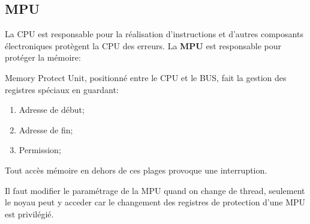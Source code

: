 \documentclass{article}
\begin{document}
\subsection{MPU}
La CPU est responsable pour la réalisation d'instructions et d'autres composants électroniques protègent la CPU des erreurs. La \textbf{MPU} est responsable pour protéger la mémoire:
\begin{definition}\label{def:MPU}
    Memory Protect Unit, positionné entre le CPU et le BUS, fait la gestion des registres spéciaux en guardant:
    \begin{enumerate}[noitemsep]
        \item Adresse de début;
        \item Adresse de fin;
        \item Permission;
    \end{enumerate}
\end{definition}
Tout accès mémoire en dehors de ces plages provoque une interruption.

\begin{remark}
    Il faut modifier le paramétrage de la MPU quand on change de thread, seulement le noyau peut y acceder car le changement des registres de protection d'une MPU est privilégié.
\end{remark}
\end{document}
